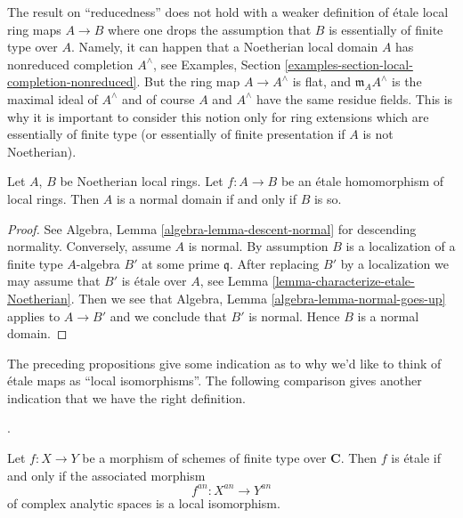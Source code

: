 \begin{remark}
\label{remark-technicality-needed}
The result on ``reducedness'' does not hold with a weaker
definition of \'etale local ring maps $A \to B$ where one
drops the assumption that $B$ is essentially of finite type over $A$.
Namely, it can happen that a Noetherian local domain $A$ has nonreduced
completion $A^\wedge$, see
Examples, Section \ref{examples-section-local-completion-nonreduced}.
But the ring map $A \to A^\wedge$ is flat, and $\mathfrak m_AA^\wedge$
is the maximal ideal of $A^\wedge$ and of course $A$ and $A^\wedge$ have
the same residue fields. This is why it is important to consider
this notion only for ring extensions which are essentially of finite type
(or essentially of finite presentation if $A$ is not Noetherian).
\end{remark}

\begin{proposition}
\label{proposition-etale-normal}
\begin{reference}
\cite[Expose I, Theorem 9.5 part (i)]{SGA1}
\end{reference}
Let $A$, $B$ be Noetherian local rings.
Let $f : A \to B$ be an \'etale homomorphism of local rings.
Then $A$ is a normal domain if and only if $B$ is so.
\end{proposition}

\begin{proof}
See
Algebra, Lemma \ref{algebra-lemma-descent-normal}
for descending normality. Conversely, assume $A$ is normal.
By assumption $B$ is a localization of a finite type $A$-algebra
$B'$ at some prime $\mathfrak q$. After replacing $B'$ by a localization
we may assume that $B'$ is \'etale over $A$, see
Lemma \ref{lemma-characterize-etale-Noetherian}.
Then we see that
Algebra, Lemma \ref{algebra-lemma-normal-goes-up}
applies to $A \to B'$ and we conclude that $B'$ is normal.
Hence $B$ is a normal domain.
\end{proof}

\noindent
The preceding propositions give some indication as to why we'd like to think
of \'etale maps as ``local isomorphisms''. The following comparison gives
another indication that we have the right definition.

\begin{lemma}
\label{lemma-etale-analytification-local-isomorphism}
\begin{reference}
\cite[Expos\'e 190, n\textsuperscript{o} 3, p. 308]{FGA}.
\end{reference}
Let $f : X \to Y$ be a morphism of schemes of finite type over
$\mathbf{C}$. Then $f$ is \'etale if and only if the associated morphism
$$
f^{an} : X^{an} \longrightarrow Y^{an}
$$
of complex analytic spaces is a local isomorphism.
\end{lemma}


